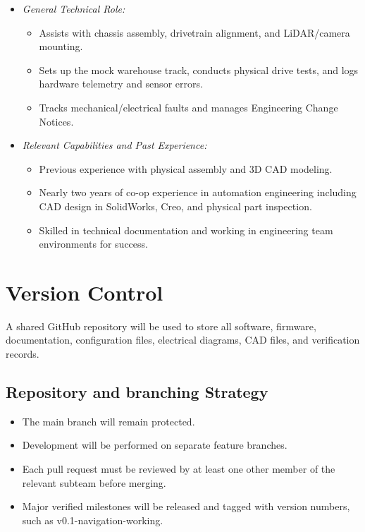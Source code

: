 \documentclass{article}
\begin{document}
\begin{itemize}
\begin{itemize}
    	\item \textit{General Technical Role:}
    	\begin{itemize}
       		\item Assists with chassis assembly, drivetrain alignment, and LiDAR/camera mounting. 
    		\item Sets up the mock warehouse track, conducts physical drive tests, and logs hardware telemetry and sensor errors. 
    		\item Tracks mechanical/electrical faults and manages Engineering Change Notices.
    	\end{itemize}
    	
    	\item \textit{Relevant Capabilities and Past Experience:}
    	\begin{itemize}
    		\item Previous experience with physical assembly and 3D CAD modeling.  
    		\item Nearly two years of co-op experience in automation engineering including CAD design in SolidWorks, Creo, and physical part inspection. 
    		\item Skilled in technical documentation and working in engineering team environments for success.
    	\end{itemize}	
    	
    	
    	
    \end{itemize}
\end{itemize}



\section{Version Control}
A shared GitHub repository will be used to store all software, firmware, documentation, configuration files, electrical diagrams, CAD files, and verification records.


\subsection{Repository and branching Strategy}

\begin{itemize}
	\item The main branch will remain protected.
	\item Development will be performed on separate feature branches.
	\item Each pull request must be reviewed by at least one other member of the relevant subteam before merging.
	\item Major verified milestones will be released and tagged with version numbers, such as v0.1-navigation-working.
\end{itemize}
\end{document}
